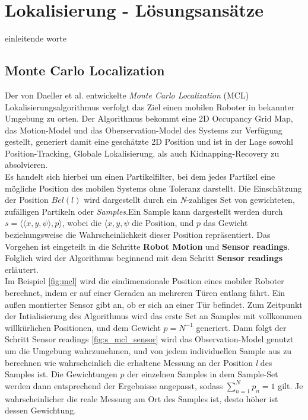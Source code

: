 \clearpage
\chapter{\textbf{Lokalisierung - Lösungsansätze}}\label{chap:Lokalisierung - Lösungsansätze}
einleitende worte

\section{Monte Carlo Localization}\label{sec:mcl}

Der von Daeller et al. \cite{Monte-Carlo-Localization} entwickelte \textit{Monte Carlo Localization} (MCL) Lokalisierungsalgorithmus verfolgt das Ziel einen mobilen Roboter in bekannter Umgebung zu orten. Der Algorithmus bekommt eine 2D Occupancy Grid Map, das Motion-Model und das Oberservation-Model des Systems zur Verfügung gestellt, generiert damit eine geschätzte 2D Position und ist in der Lage sowohl Position-Tracking, Globale Lokalisierung, als auch Kidnapping-Recovery zu absolvieren. \\
Es handelt sich hierbei um einen Partikelfilter, bei dem jedes Partikel eine mögliche Position des mobilen Systems ohne Toleranz darstellt. Die Einschätzung der Position $Bel(l)$ wird dargestellt durch ein \textit{N}-zahliges Set von gewichteten, zufälligen Partikeln oder \textit{Samples}.Ein Sample kann dargestellt werden durch $s=\langle\langle x,y,\psi \rangle,p\rangle$, wobei die $\langle x,y,\psi$ die Position, und $p$ das Gewicht beziehungsweise die Wahrscheinlichkeit dieser Position repräsentiert. Das Vorgehen ist eingeteilt in die Schritte \textbf{Robot Motion} und \textbf{Sensor readings}. Folglich wird der Algorithmus beginnend mit dem Schritt \textbf{Sensor readings} erläutert.\\
Im Beispiel \ref{fig:mcl} wird die eindimensionale Position eines mobiler Roboter berechnet, indem er auf einer Geraden an mehreren Türen entlang fährt. Ein außen montierter Sensor gibt an, ob er sich an einer Tür befindet. Zum Zeitpunkt der Intialisierung des Algorithmus wird das erste Set an Samples mit vollkommen willkürlichen Positionen, und dem Gewicht $p=N^{-1}$ generiert. Dann folgt der Schritt Sensor readings \ref{fig:s_mcl_sensor} wird das Observation-Model genutzt um die Umgebung wahrzunehmen, und von jedem individuellen Sample aus zu berechnen wie wahrscheinlich die erhaltene Messung an der Position \textit{l} des Samples ist. Die Gewichtungen $p$ der einzelnen Samples in dem Sample-Set werden dann entsprechend der Ergebnisse angepasst, sodass $\sum_{n=1}^{N} p_n =1$ gilt. Je wahrscheinlicher die reale Messung am Ort des Samples ist, desto höher ist dessen Gewichtung.
